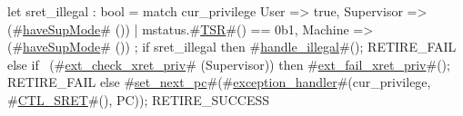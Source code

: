 let sret_illegal : bool = match cur_privilege {
  User       => true,
  Supervisor => ~ (#\hyperref[sailRISCVzhaveSupMode]{haveSupMode}# ()) | mstatus.#\hyperref[sailRISCVzTSR]{TSR}#() == 0b1,
  Machine    => ~ (#\hyperref[sailRISCVzhaveSupMode]{haveSupMode}# ())
};
if   sret_illegal
then { #\hyperref[sailRISCVzhandlezyillegal]{handle\_illegal}#(); RETIRE_FAIL }
else if ~(#\hyperref[sailRISCVzextzycheckzyxretzypriv]{ext\_check\_xret\_priv}# (Supervisor))
then { #\hyperref[sailRISCVzextzyfailzyxretzypriv]{ext\_fail\_xret\_priv}#(); RETIRE_FAIL }
else {
  #\hyperref[sailRISCVzsetzynextzypc]{set\_next\_pc}#(#\hyperref[sailRISCVzexceptionzyhandler]{exception\_handler}#(cur_privilege, #\hyperref[sailRISCVzCTLzySRET]{CTL\_SRET}#(), PC));
  RETIRE_SUCCESS
}

